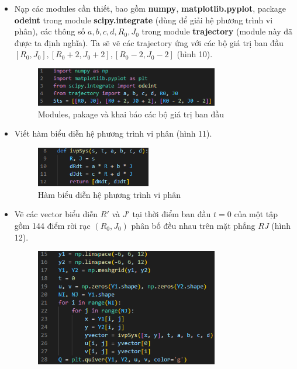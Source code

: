 \begin{itemize}
    \item Nạp các modules cần thiết, bao gồm \textbf{numpy}, \textbf{matplotlib.pyplot}, package \textbf{odeint} trong module \textbf{scipy.integrate} (dùng để giải hệ phương trình vi phân), các thông số $a, b, c, d, R_0, J_0$ trong module \textbf{trajectory} (module này đã được ta định nghĩa). Ta sẽ vẽ các trajectory ứng với các bộ giá trị ban đầu $[R_0, J_0], [R_0+2,J_0+2], [R_0-2,J_0-2]$ (hình 10).
    \begin{figure}[h!]
        \begin{center}
        \includegraphics[width=8cm]{images/pakage_init.png}
        \end{center}
        \caption{Modules, pakage và khai báo các bộ giá trị ban đầu}
    \end{figure}
    \item Viết hàm biểu diễn hệ phương trình vi phân (hình 11).
    \begin{figure}[h!]
        \begin{center}
        \includegraphics[width=5cm]{images/ivpSys.png}
        \end{center}
        \caption{Hàm biểu diễn hệ phương trình vi phân}
    \end{figure}
    \item Vẽ các vector biểu diễn $R'$ và $J'$ tại thời điểm ban đầu $t=0$ của một tập gồm 144 điểm rời rạc $(R_0,J_0)$ phân bố đều nhau trên mặt phẳng $RJ$ (hình 12).
    \begin{figure}[h!]
        \begin{center}
        \includegraphics[width=8cm]{images/vector_field.png}

\end{center}
\end{figure}
\end{itemize}
